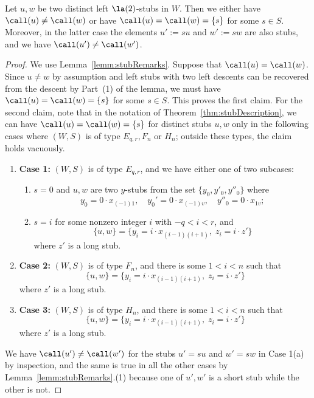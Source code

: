\begin{lemma}
    \label{lemm:stubDescents}
    Let $u,w$ be two distinct left $\la(2)$-stubs in $W$.  Then we either have $\call(u)\neq \call(w)$ or have
    $\call(u)=\call(w)=\{s\}$ for some $s\in S$. Moreover, in the latter case the elements $u':=su$ and $w':=sw$
    are also stubs, and we have $\call(u')\neq \call(w')$. 
\end{lemma}
\begin{proof} 
    We use Lemma~\ref{lemm:stubRemarks}. Suppose that $\call(u)=\call(w)$.  Since $u\neq w$ by assumption and left stubs
    with two left descents can be recovered from the descent by Part~(1) of the lemma, we must have
    $\call(u)=\call(w)=\{s\}$ for some $s\in S$. This proves the first claim.  For the second claim, note that in
    the notation of Theorem~\ref{thm:stubDescription}, we can have $\call(u)=\call(w)=\{s\}$ for distinct stubs $u,w$ only
    in the following cases where $(W,S)$ is of type $E_{q,r}, F_n$ or $H_n$; outside these types, the claim holds
    vacuously.

    \begin{enumerate}[label=\textup{(\roman*)}]
        \item \textbf{Case 1:} $(W,S)$ is of type $E_{q,r}$, and we have either one of two subcases:
            \begin{enumerate}                
                \item $s=0$ and $u,w$ are two $y$-stubs from the set $\{y_0,y'_0,y''_0\}$ where \[y_0=0\cdot
                    x_{(-1)1}, \quad y_0'=0\cdot x_{(-1)v},\quad y''_0=0\cdot x_{1v};\]
                \item $s=i$ for some nonzero integer $i$ with $-q<i<r$, and 
                    \[ 
                        \{u,w\}=\{y_i=i\cdot
                    x_{(i-1)(i+1)},\; z_i=i\cdot z'\} \] 
                    where $z'$ is a long stub.
            \end{enumerate}
        \item\textbf{Case 2:} 
            $(W,S)$ is of type $F_n$, and there is some $1<i<n$ such that 
            \[ \{u,w\}=\{y_i=i\cdot x_{(i-1)(i+1)},\; z_i=i\cdot z'\} \]
            where $z'$ is a long stub.
        \item\textbf{Case 3:} $(W,S)$ is of type $H_n$, and there is some $1<i<n$ such that 
            \[ \{u,w\}=\{y_i=i\cdot x_{(i-1)(i+1)},\; z_i=i\cdot z'\}  \]
            where $z'$ is a long stub.
    \end{enumerate} 
   We have $\call(u')\neq \call(w')$ for the stubs  $u'=su$ and $w'=sw$ in Case 1(a) by inspection,
   and the same is true in all the other cases by Lemma~\ref{lemm:stubRemarks}.(1) because one of $u',w'$
   is a short stub while the other is not.
\end{proof}

